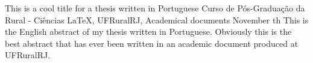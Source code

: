 \documentclass[tese]{UFRuralRJ}
\begin{document}
\generalabstracttrue
\begin{englishabstract}
{This is a cool title for a thesis written in Portuguese} %
{Curso de Pós-Graduação da Rural - Ciências} %
{LaTeX, UFRuralRJ, Academical documents} %
{November} %
{th} %
This is the English abstract of my thesis written in Portuguese. Obviously this
is the best abstract that has ever been written in an academic document produced
at UFRuralRJ.
\end{englishabstract}
\listoffigures                         %
\listofappendix                        %
\tableofcontents                       %
\setlength{\baselineskip}{1.5\baselineskip}
\end{document}
